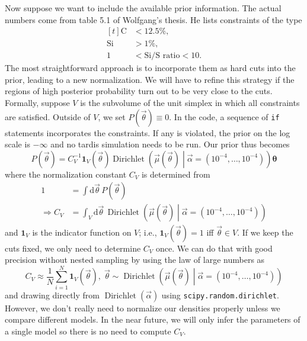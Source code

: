 \documentclass[a4,12pt]{article}
\DeclareMathOperator{\Dirichlet}{Dirichlet}
\newcommand{\rmdx}[1]{\mbox{d} #1 \,} %
\newcommand{\vecalpha}{\ensuremath{\vec{\alpha}}}
\newcommand{\vecmu}{\ensuremath{\vec{\mu}}}
\newcommand{\vecth}{\ensuremath{{\vec{\theta}}}}
\begin{document}
Now suppose we want to include the available prior information. The
actual numbers come from table 5.1 of Wolfgang's thesis. He lists
constraints of the type
\begin{equation}
  \begin{aligned}[t]
    \label{eq:abundance-constraints}
    \mbox{C}  &< 12.5 \%,\\
    \mbox{Si} &>1 \%,\\
    1 &<\mbox{Si/S ratio} < 10 .
  \end{aligned}
\end{equation}
The most straightforward approach is to incorporate them as hard cuts
into the prior, leading to a new normalization. We will have to refine
this strategy if the regions of high posterior probability turn out to
be very close to the cuts. Formally, suppose $V$ is the subvolume of
the unit simplex in which all constraints are satisfied. Outside of
$V$, we set $P(\vecth) \equiv 0$. In the code, a sequence of
\texttt{if} statements incorporates the constraints. If any is
violated, the prior on the log scale is $-\infty$ and no tardis
simulation needs to be run. Our prior thus becomes
\begin{equation}
  \label{eq:abundances-prior}
  P(\vecth) = C_V^{-1} \mathbf{1}_V(\vecth) \Dirichlet\left(\vecmu(\vecth) \middle| \vecalpha=(10^{-4}, \dots, 10^{-4})\right) \boldsymbol{\theta}
\end{equation}
where the normalization constant $C_V$ is  determined from
\begin{equation}
  \begin{aligned}
    \label{eq:abundance-normalization}
    1 &= \int \rmdx{\vecth} P(\vecth)\\
    \Rightarrow C_V  &= \int_V \rmdx{\vecth} \Dirichlet\left(\vecmu(\vecth) \middle| \vecalpha=(10^{-4}, \dots, 10^{-4})\right)
  \end{aligned}
\end{equation}
and $\mathbf{1}_V$ is the indicator function on $V$; i.e.,
$\mathbf{1}_V(\vecth) = 1$ iff $\vecth \in V$.  If we keep the cuts
fixed, we only need to determine $C_V$ once. We can do that with good
precision without nested sampling by using the law of large numbers as
\begin{equation}
  \label{eq:abundances-large-numbers}
  C_V \approx \frac{1}{N} \sum_{i=1}^N \mathbf{1}_V(\vecth), \; \vecth \sim \Dirichlet\left(\vecmu(\vecth) \middle| \vecalpha=(10^{-4}, \dots, 10^{-4})\right)
\end{equation}
and drawing directly from $\Dirichlet(\vecalpha)$ using
\texttt{scipy.random.dirichlet}. However, we don't really need to
normalize our densities properly unless we compare different
models. In the near future, we will only infer the parameters of a
single model so there is no need to compute $C_V$.
\end{document}
